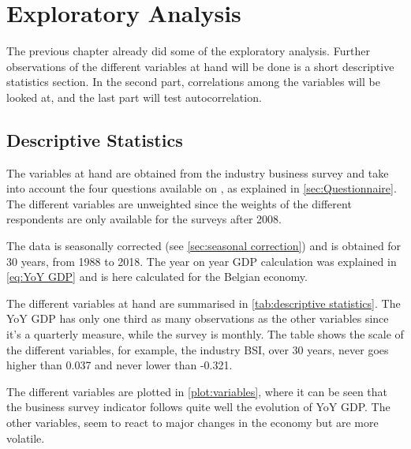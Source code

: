 \documentclass[12pt,a4paper,oneside]{book}
\begin{document}
\chapter{Exploratory Analysis}

The previous chapter already did some of the exploratory analysis.
Further observations of the different variables at hand will be done is a short descriptive statistics section.
In the second part, correlations among the variables will be looked at, and the last part will test autocorrelation.


\section{Descriptive Statistics}

The variables at hand are obtained from the industry business survey and take into account the four questions available on , as explained in \autoref{sec:Questionnaire}.
The different variables are unweighted since the weights of the different respondents are only available for the surveys after 2008.

The data is seasonally corrected (see \autoref{sec:seasonal correction}) and is obtained for 30 years, from 1988 to 2018.
The year on year GDP calculation was explained in \autoref{eq:YoY GDP} and is here calculated for the Belgian economy.

The different variables at hand are summarised in \autoref{tab:descriptive statistics}. The YoY GDP has only one third as many observations as the other variables since it's a quarterly measure, while the survey is monthly. 
The table shows the scale of the different variables, for example, the industry BSI, over 30 years, never goes higher than 0.037 and never lower than -0.321.

The different variables are plotted in \autoref{plot:variables}, where it can be seen that the business survey indicator follows quite well the evolution of YoY GDP. 
The other variables, seem to react to major changes in the economy but are more volatile. 
\end{document}
